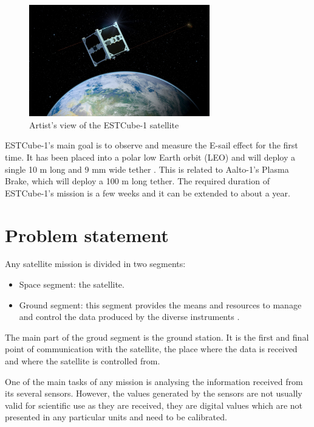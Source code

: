 \begin{figure}[H]
\centerline{\includegraphics[width=0.7\textwidth]{images/ESTCube.jpg}}
\caption{Artist's view of the ESTCube-1 satellite}
\label{f1.5}
\end{figure}

ESTCube-1's main goal is to observe and measure the E-sail effect for the first time. It has been placed into a polar low Earth orbit (LEO) and will deploy a single 10 m long and 9 mm wide tether \cite{ESTCube}. This is related to Aalto-1's Plasma Brake, which will deploy a 100 m long tether. The required duration of ESTCube-1's mission is a few weeks and it can be extended to about a year.


\section{Problem statement}\label{1.2}

Any satellite mission is divided in two segments:
\begin{itemize}

	\item Space segment: the satellite.
	\item Ground segment: this segment provides the means and resources to manage and control the data produced by the diverse instruments \cite{ESA}. 

\end{itemize}

The main part of the groud segment is the ground station. It is the first and final point of communication with the satellite, the place where the data is received and where the satellite is controlled from.


One of the main tasks of any mission is analysing the information received from its several sensors. However, the values generated by the sensors are not usually valid for scientific use as they are received, they are digital values which are not presented in any particular units and need to be calibrated.\\

